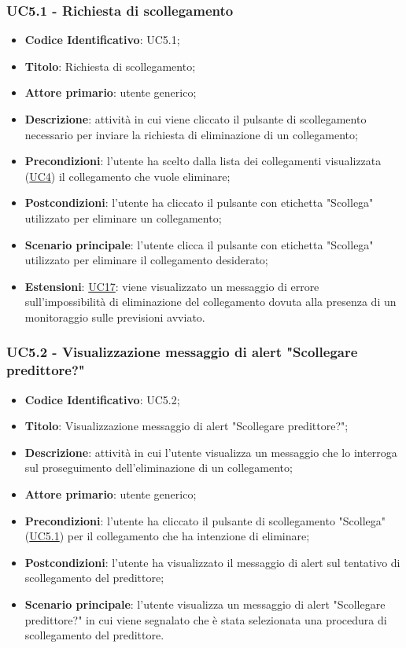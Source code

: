 			\label{par:UC5.1}
	\subsubsection{UC5.1 - Richiesta di scollegamento}
		\begin{itemize}
			\item\textbf{Codice Identificativo}: UC5.1;
			\item\textbf{Titolo}: Richiesta di scollegamento;
			\item\textbf{Attore primario}: utente generico;
			\item\textbf{Descrizione}: attività in cui viene cliccato il pulsante di scollegamento necessario per inviare la richiesta di eliminazione di un collegamento;
			\item\textbf{Precondizioni}: l'utente ha scelto dalla lista dei collegamenti visualizzata (\hyperref[par:UC4]{UC4}) il collegamento che vuole eliminare;
			\item\textbf{Postcondizioni}: l'utente ha cliccato il pulsante con etichetta "Scollega" utilizzato per eliminare un collegamento;
			\item\textbf{Scenario principale}: l'utente clicca il pulsante con etichetta "Scollega" utilizzato per eliminare il collegamento desiderato;
			\item\textbf{Estensioni}: \hyperref[par:UC17]{UC17}: viene visualizzato un messaggio di errore sull'impossibilità di eliminazione del collegamento dovuta alla presenza di un monitoraggio sulle previsioni avviato.					
	
		\end{itemize}		
		
		
	\label{par:UC5.2}
	\subsubsection{UC5.2 - Visualizzazione messaggio di alert "Scollegare predittore?"}
		\begin{itemize}
			\item\textbf{Codice Identificativo}: UC5.2;
			\item\textbf{Titolo}: Visualizzazione messaggio di alert "Scollegare predittore?";
			\item\textbf{Descrizione}: attività in cui l'utente visualizza un messaggio che lo interroga sul proseguimento dell'eliminazione di un collegamento;
			\item\textbf{Attore primario}: utente generico;
			\item\textbf{Precondizioni}: l'utente ha cliccato il pulsante di scollegamento "Scollega" (\hyperref[par:UC5.1]{UC5.1}) per il collegamento che ha intenzione di eliminare;
			\item\textbf{Postcondizioni}: l'utente ha visualizzato il messaggio di alert sul tentativo di scollegamento del predittore;
					
			\item\textbf{Scenario principale}: l'utente visualizza un messaggio di alert "Scollegare predittore?" in cui viene segnalato che è stata selezionata una procedura di scollegamento del predittore.
	
		\end{itemize}		
		
